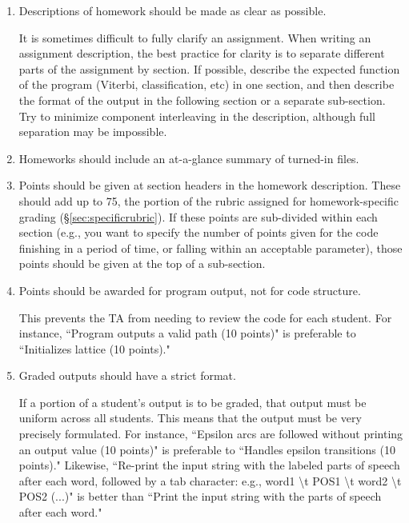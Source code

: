 \documentclass[12pt]{article}
\begin{document}
\begin{enumerate}
\item {Descriptions of homework should be made as clear as possible. 

It is sometimes difficult to fully clarify an assignment. When writing an assignment description, the best practice for clarity is to separate different parts of the assignment by section. If possible, describe the expected function of the program (Viterbi, classification, etc) in one section, and then describe the format of the output in the following section or a separate sub-section. Try to minimize component interleaving in the description, although full separation may be impossible. }

\item {Homeworks should include an at-a-glance summary of turned-in files. }

\item {Points should be given at section headers in the homework description. These should add up to 75, the portion of the rubric assigned for homework-specific grading (\S\ref{sec:specificrubric}). If these points are sub-divided within each section (e.g., you want to specify the number of points given for the code finishing in a period of time, or falling within an acceptable parameter), those points should be given at the top of a sub-section. }

\item {Points should be awarded for program output, not for code structure.
  
  This prevents the TA from needing to review the code for each student. For instance, ``Program outputs a valid path (10 points)" is preferable to ``Initializes lattice (10 points)."}
 
\item {Graded outputs should have a strict format.
  
  If a portion of a student's output is to be graded, that output must be uniform across all students. This means that the output must be very precisely formulated. For instance, ``Epsilon arcs are followed without printing an output value (10 points)" is preferable to ``Handles epsilon transitions (10 points)." Likewise, ``Re-print the input string with the labeled parts of speech after each word, followed by a tab character: e.g., word1 {\textbackslash}t POS1 {\textbackslash}t word2 {\textbackslash}t POS2 (...)" is better than ``Print the input string with the parts of speech after each word." }
 

\end{enumerate}
\end{document}
